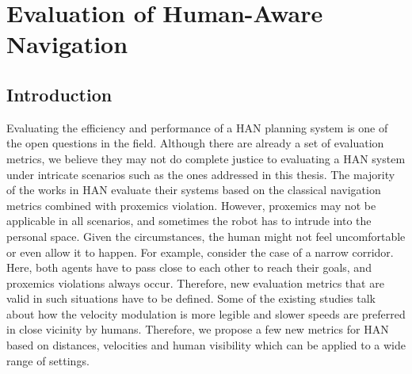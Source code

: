 \ifdefined{}
\else
\setcounter{chapter}{5} %
\dominitoc
\faketableofcontents
\fi

\chapter{Evaluation of Human-Aware Navigation}
\label{chap:6}
\minitoc

\section{Introduction}



Evaluating the efficiency and performance of a HAN planning system is one of the open questions in the field. Although there are already a set of evaluation metrics, we believe they may not do complete justice to evaluating a HAN system under intricate scenarios such as the ones addressed in this thesis. The majority of the works in HAN evaluate their systems based on the classical navigation metrics combined with proxemics violation. However, proxemics may not be applicable in all scenarios, and sometimes the robot has to intrude into the personal space. Given the circumstances, the human might not feel uncomfortable or even allow it to happen. For example, consider the case of a narrow corridor. Here, both agents have to pass close to each other to reach their goals, and proxemics violations always occur. Therefore, new evaluation metrics that are valid in such situations have to be defined. Some of the existing studies \cite{takayama2009influences, lichtenthaler2012increasing, kruse2014evaluating} talk about how the velocity modulation is more legible and slower speeds are preferred in close vicinity by humans. Therefore, we propose a few new metrics for HAN based on distances, velocities and human visibility which can be applied to a wide range of settings.

